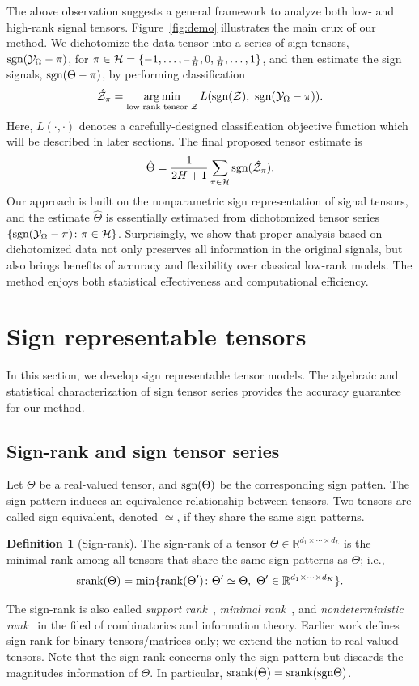 \documentclass{article}
\theoremstyle{plain}
\theoremstyle{definition}
\newtheorem{defn}{Definition}
\def\sign{\textup{sgn}}
\def\srank{\textup{srank}}
\def\rank{\textup{rank}}
\begin{document}
The above observation suggests a general framework to analyze both low- and high-rank signal tensors. Figure~\ref{fig:demo} illustrates the main crux of our method. We dichotomize the data tensor into a series of sign tensors, $\sign (\tY_\Omega-\pi)$, for $\pi\in \mathcal{H}=\{-1,\ldots, {\scriptstyle -{1\over H}},0,{\scriptstyle {1\over H}},\ldots,1\}$, and then estimate the sign signals, $\sign(\Theta-\pi)$, by performing classification
\[
\hat \tZ_\pi=\argmin_{\text{low rank tensor $\tZ$}} L(\sign(\tZ),\ \sign (\tY_\Omega-\pi)).
\]
Here, $L(\cdot,\cdot)$ denotes a carefully-designed classification objective function which will be described in later sections. The final proposed tensor estimate is 
\[
\hat \Theta = {1\over 2H+1}\sum_{\pi \in \tH} \sign(\hat \tZ_\pi).
\]
Our approach is built on the nonparametric sign representation of signal tensors, and the estimate $\hat \Theta$ is essentially estimated from dichotomized tensor series $\{\sign(\tY_\Omega-\pi)\colon \pi \in \tH\}$. Surprisingly, we show that proper analysis based on dichotomized data not only preserves all information in the original signals, but also brings benefits of accuracy and flexibility over classical low-rank models. The method enjoys both statistical effectiveness and computational efficiency. 


\section{Sign representable tensors}\label{sec:representation}
In this section, we develop sign representable tensor models. The algebraic and statistical characterization of sign tensor series provides the accuracy guarantee for our method. 

\subsection{Sign-rank and sign tensor series}
Let $\Theta$ be a real-valued tensor, and $\sign (\Theta)$ be the corresponding sign patten. The sign pattern induces an equivalence relationship between tensors. Two tensors are called sign equivalent, denoted $\simeq$, if they share the same sign patterns. 

\begin{defn}[Sign-rank]
The sign-rank of a tensor $\Theta\in\mathbb{R}^{d_1\times \cdots \times d_L}$ is the minimal rank among all tensors that share the same sign patterns as $\Theta$; i.e.,
\[
\srank(\Theta) = \min \{\rank(\Theta')\colon  \Theta'\simeq \Theta,\ \Theta'\in\mathbb{R}^{d_1\times \cdots \times d_K}\}.
\]
\end{defn}
The sign-rank is also called \emph{support rank}~\cite{cohn2013fast}, \emph{minimal rank}~\cite{alon2016sign}, and \emph{nondeterministic rank}~\cite{de2003nondeterministic} in the filed of combinatorics and information theory. Earlier work defines sign-rank for binary tensors/matrices only; we extend the notion to real-valued tensors. Note that the sign-rank concerns only the sign pattern but discards the magnitudes information of $\Theta$. In particular, $\srank(\Theta)=\srank(\sign \Theta)$. 
\end{document}
